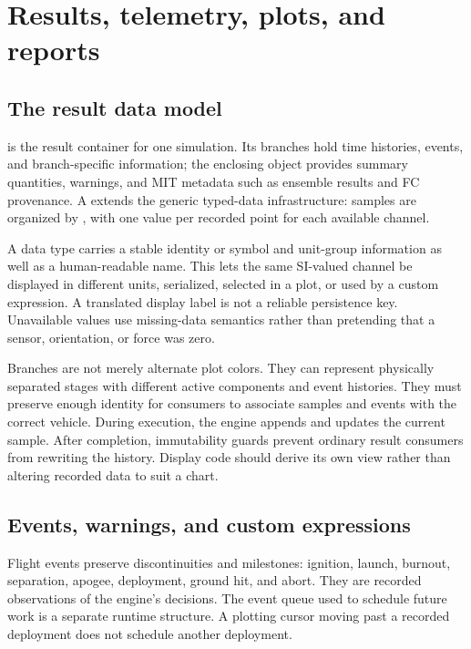 \chapter{Results, telemetry, plots, and reports}\label{ch:results}
\section{The result data model}
 is the result container for one simulation. Its branches hold time histories, events, and branch-specific information; the enclosing object provides summary quantities, warnings, and MIT metadata such as ensemble results and FC provenance. A  extends the generic typed-data infrastructure: samples are organized by , with one value per recorded point for each available channel.

A data type carries a stable identity or symbol and unit-group information as well as a human-readable name. This lets the same SI-valued channel be displayed in different units, serialized, selected in a plot, or used by a custom expression. A translated display label is not a reliable persistence key. Unavailable values use missing-data semantics rather than pretending that a sensor, orientation, or force was zero.

Branches are not merely alternate plot colors. They can represent physically separated stages with different active components and event histories. They must preserve enough identity for consumers to associate samples and events with the correct vehicle. During execution, the engine appends and updates the current sample. After completion, immutability guards prevent ordinary result consumers from rewriting the history. Display code should derive its own view rather than altering recorded data to suit a chart.


\section{Events, warnings, and custom expressions}
Flight events preserve discontinuities and milestones: ignition, launch, burnout, separation, apogee, deployment, ground hit, and abort. They are recorded observations of the engine's decisions. The event queue used to schedule future work is a separate runtime structure. A plotting cursor moving past a recorded deployment does not schedule another deployment.

